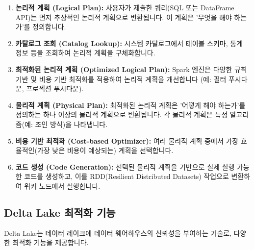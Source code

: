 \documentclass[11pt,a4paper]{article}
\begin{document}
\begin{enumerate}
    \item \textbf{논리적 계획 (Logical Plan):} 사용자가 제출한 쿼리(SQL 또는 DataFrame API)는 먼저 추상적인 논리적 계획으로 변환됩니다. 이 계획은 '무엇을 해야 하는가'를 정의합니다.
    \item \textbf{카탈로그 조회 (Catalog Lookup):} 시스템 카탈로그에서 테이블 스키마, 통계 정보 등을 조회하여 논리적 계획을 구체화합니다.
    \item \textbf{최적화된 논리적 계획 (Optimized Logical Plan):} Spark 엔진은 다양한 규칙 기반 및 비용 기반 최적화를 적용하여 논리적 계획을 개선합니다 (예: 필터 푸시다운, 프로젝션 푸시다운).
    \item \textbf{물리적 계획 (Physical Plan):} 최적화된 논리적 계획은 '어떻게 해야 하는가'를 정의하는 하나 이상의 물리적 계획으로 변환됩니다. 각 물리적 계획은 특정 알고리즘(예: 조인 방식)을 나타냅니다.
    \item \textbf{비용 기반 최적화 (Cost-based Optimizer):} 여러 물리적 계획 중에서 가장 효율적인(가장 낮은 비용이 예상되는) 계획을 선택합니다.
    \item \textbf{코드 생성 (Code Generation):} 선택된 물리적 계획을 기반으로 실제 실행 가능한 코드를 생성하고, 이를 RDD(Resilient Distributed Datasets) 작업으로 변환하여 워커 노드에서 실행합니다.
\end{enumerate}

\subsection{Delta Lake 최적화 기능}
Delta Lake는 데이터 레이크에 데이터 웨어하우스의 신뢰성을 부여하는 기술로, 다양한 최적화 기능을 제공합니다.
\end{document}
